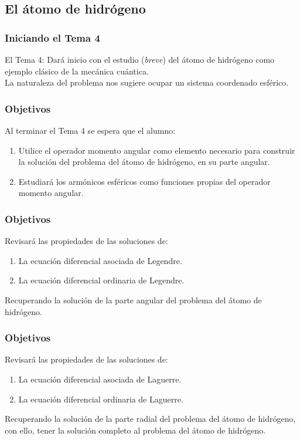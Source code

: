 \documentclass[12pt]{beamer}
\begin{document}
\subsection{El átomo de hidrógeno}

\begin{frame}
\frametitle{Iniciando el Tema 4}
El Tema 4: Dará inicio con el estudio (\emph{breve}) del átomo de hidrógeno como ejemplo clásico de la mecánica cuántica.
\\
\bigskip
\pause
La naturaleza del problema nos sugiere ocupar un sistema coordenado esférico.
\end{frame}
\begin{frame}
\frametitle{Objetivos}
Al terminar el Tema 4 se espera que el alumno:
\begin{enumerate}[<+->]
\item Utilice el operador momento angular como elemento necesario para construir la solución del problema del átomo de hidrógeno, en su parte angular.
\item Estudiará los armónicos esféricos como funciones propias del operador momento angular.
\seti
\end{enumerate}
\end{frame}
\begin{frame}
\frametitle{Objetivos}
Revisará las propiedades de las soluciones de:
\begin{enumerate}[<+->]
\conti
\item La ecuación diferencial asociada de Legendre.
\item La ecuación diferencial ordinaria de Legendre.
\seti
\end{enumerate}
\pause
Recuperando la solución de la parte angular del problema del átomo de hidrógeno.
\end{frame}
\begin{frame}
\frametitle{Objetivos}
Revisará las propiedades de las soluciones de:
\begin{enumerate}[<+->]
\conti
\item La ecuación diferencial asociada de Laguerre.
\item La ecuación diferencial ordinaria de Laguerre.
\seti
\end{enumerate}
\pause
Recuperando la solución de la parte radial del problema del átomo de hidrógeno, con ello, tener la solución completo al problema del átomo de hidrógeno.
\end{frame}
\end{document}
